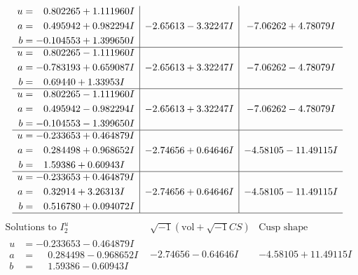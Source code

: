 \documentclass[1p]{elsarticle_modified}
\theoremstyle{definition}
\newcommand{\I}{\sqrt{-1}}
\begin{document}
$$\begin{array}{c|c|c}
\begin{aligned}
u &= \phantom{-}0.802265 + 1.111960 I \\
a &= \phantom{-}0.495942 + 0.982294 I \\
b &= -0.104553 + 1.399650 I\end{aligned}
 & -2.65613 - 3.32247 I & -7.06262 + 4.78079 I \\ \hline\begin{aligned}
u &= \phantom{-}0.802265 - 1.111960 I \\
a &= -0.783193 + 0.659087 I \\
b &= \phantom{-}0.69440 + 1.33953 I\end{aligned}
 & -2.65613 + 3.32247 I & -7.06262 - 4.78079 I \\ \hline\begin{aligned}
u &= \phantom{-}0.802265 - 1.111960 I \\
a &= \phantom{-}0.495942 - 0.982294 I \\
b &= -0.104553 - 1.399650 I\end{aligned}
 & -2.65613 + 3.32247 I & -7.06262 - 4.78079 I \\ \hline\begin{aligned}
u &= -0.233653 + 0.464879 I \\
a &= \phantom{-}0.284498 + 0.968652 I \\
b &= \phantom{-}1.59386 + 0.60943 I\end{aligned}
 & -2.74656 + 0.64646 I & -4.58105 - 11.49115 I \\ \hline\begin{aligned}
u &= -0.233653 + 0.464879 I \\
a &= \phantom{-}0.32914 + 3.26313 I \\
b &= \phantom{-}0.516780 + 0.094072 I\end{aligned}
 & -2.74656 + 0.64646 I & -4.58105 - 11.49115 I\\
 \hline 
 \end{array}$$\newpage$$\begin{array}{c|c|c}  
\text{Solutions to }I^u_{2}& \I (\text{vol} + \sqrt{-1}CS) & \text{Cusp shape}\\
 \hline 
\begin{aligned}
u &= -0.233653 - 0.464879 I \\
a &= \phantom{-}0.284498 - 0.968652 I \\
b &= \phantom{-}1.59386 - 0.60943 I\end{aligned}
 & -2.74656 - 0.64646 I & -4.58105 + 11.49115 I \\ \hline\begin{aligned}

\end{aligned}
\end{array}$$
\end{document}
